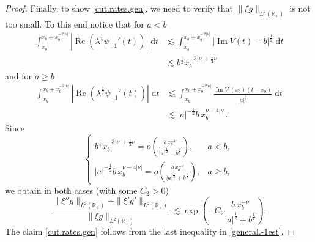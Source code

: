 \begin{proof}
Finally, to show \eqref{cut.rates.gen}, we need to verify that $\|\xi g\|_{L^2({\mathbb{R}}_+)}$ is not too small. To this end notice that for $a< b$
\begin{equation}\label{gen.norm.1}
\begin{aligned}
\int_{x_b}^{x_b+x_b^{-2 |\nu|}} |{\operatorname{Re}} (\lambda^\frac 12 \psi_{-1}'(t))| \; {\mathrm{d}} t 
&{\lesssim} 
\int_{x_b}^{x_b+x_b^{-2 |\nu|}} |{\operatorname{Im}} V(t) - b|^\frac12 \; {\mathrm{d}} t 
\\
&{\lesssim} 
b^\frac12 x_b^{-3|\nu| + \frac12 \nu}
\end{aligned}
\end{equation}
and for $a \geq b$
\begin{equation}\label{gen.norm.2}
\begin{aligned}
\int_{x_b}^{x_b+x_b^{-2 |\nu|}} |{\operatorname{Re}} (\lambda^\frac 12 \psi_{-1}'(t))| \; {\mathrm{d}} t 
&{\lesssim} 
\int_{x_b}^{x_b+x_b^{-2 |\nu|}} \frac{{\operatorname{Im}} V'(x_b)(t-x_b)}{|a|^\frac 12} \; {\mathrm{d}} t 
\\
&{\lesssim}
|a|^{-\frac12} b \, x_b^{\nu-4|\nu|}.
\end{aligned}
\end{equation}
Since
\begin{equation}
\begin{cases}
\displaystyle 
b^\frac12 x_b^{-3|\nu| + \frac12 \nu} = o \left(\frac{b \, x_b^{-\nu}}{|a|^\frac12 + b^\frac 12}\right), & a<b,
\\[1mm]
\displaystyle 
|a|^{-\frac12} b \, x_b^{\nu-4|\nu|} = o \left(\frac{b \, x_b^{-\nu}}{|a|^\frac12 + b^\frac 12}\right), & a \geq b,
\end{cases}
\end{equation}
we obtain in both cases (with some $C_2>0$)
\begin{equation}\label{xi'g.gen.2}
\frac{\|\xi'' g\|_{L^2({\mathbb{R}}_+)} + \|\xi' g'\|_{L^2({\mathbb{R}}_+)}}{\|\xi g\|_{L^2({\mathbb{R}}_+)}}
{\lesssim} 
\exp \left(- C_2 \frac{b \, x_b^{-\nu}}{|a|^\frac12 + b^\frac 12} \right).
\end{equation}
The claim \eqref{cut.rates.gen} follows from the last inequality in \eqref{general.-1est}.
\end{proof}

